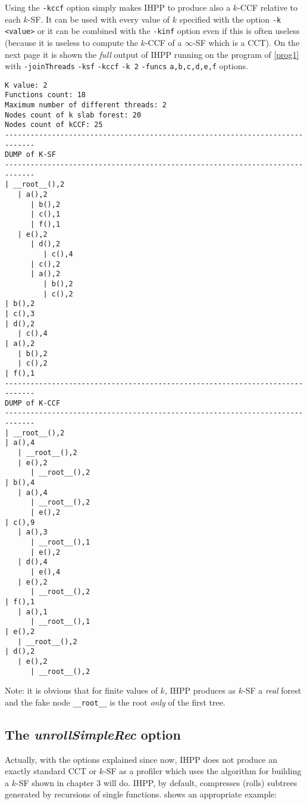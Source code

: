 \documentclass[a4paper,10pt]{report}
\begin{document}
Using the \verb|-kccf| option simply makes IHPP to produce also a $k$-CCF relative
to each $k$-SF. It can be used with every value of $k$ specified with the option
\verb|-k <value>| or it can be combined with the \verb|-kinf| option even if this is often
useless (because it is useless to compute the $k$-CCF of a $\infty$-SF which is a CCT).
On the next page it is shown the \emph{full} output of IHPP running on the program of \cref{prog1} with \verb|-joinThreads| \verb|-ksf| \verb|-kccf| \verb|-k 2| \verb|-funcs| \verb|a,b,c,d,e,f| options.
\begin{lstlisting}[label=out4, caption={a full IHPP output}, frame=bottomline]
K value: 2
Functions count: 18
Maximum number of different threads: 2
Nodes count of k slab forest: 20
Nodes count of kCCF: 25
-----------------------------------------------------------------------------
DUMP of K-SF
-----------------------------------------------------------------------------
| __root__(),2
   | a(),2
      | b(),2
      | c(),1
      | f(),1
   | e(),2
      | d(),2
         | c(),4
      | c(),2
      | a(),2
         | b(),2
         | c(),2
| b(),2
| c(),3
| d(),2
   | c(),4
| a(),2
   | b(),2
   | c(),2
| f(),1
-----------------------------------------------------------------------------
DUMP of K-CCF
-----------------------------------------------------------------------------
| __root__(),2
| a(),4
   | __root__(),2
   | e(),2
      | __root__(),2
| b(),4
   | a(),4
      | __root__(),2
      | e(),2
| c(),9
   | a(),3
      | __root__(),1
      | e(),2
   | d(),4
      | e(),4
   | e(),2
      | __root__(),2
| f(),1
   | a(),1
      | __root__(),1
| e(),2
   | __root__(),2
| d(),2
   | e(),2
      | __root__(),2
\end{lstlisting}

\noindent
Note: it is obvious that for finite values of $k$, IHPP produces as $k$-SF
a \emph{real} forest and the fake node \verb|__root__| is the root \emph{only} of the first tree.

\subsection{The \emph{unrollSimpleRec} option}

Actually, with the options explained since now, IHPP does not produce an exactly standard
CCT or $k$-SF as a profiler which uses the algorithm for building a $k$-SF shown in chapter 3 will do. IHPP, by default, compresses (rolls) subtrees generated by recursions of single functions.  shows an appropriate example:
\end{document}
